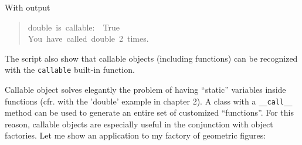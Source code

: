 \documentclass[10pt,english]{article}
\begin{document}
With output
\begin{quote}
\begin{ttfamily}\begin{flushleft}
\mbox{double~is~callable:~~True}\\
\mbox{You~have~called~double~2~times.}
\end{flushleft}\end{ttfamily}
\end{quote}

The script also show that callable objects (including functions) 
can be recognized with the \texttt{callable} built-in function.

Callable object solves elegantly the problem of having ``static'' variables
inside functions (cfr. with the 'double' example in chapter 2).
A class with a \texttt{{\_}{\_}call{\_}{\_}} method can be used to generate an entire
set of customized ``functions''. For this reason, callable objects are 
especially useful in the conjunction with object factories. Let me show 
an application to my factory of geometric figures:
\end{document}
